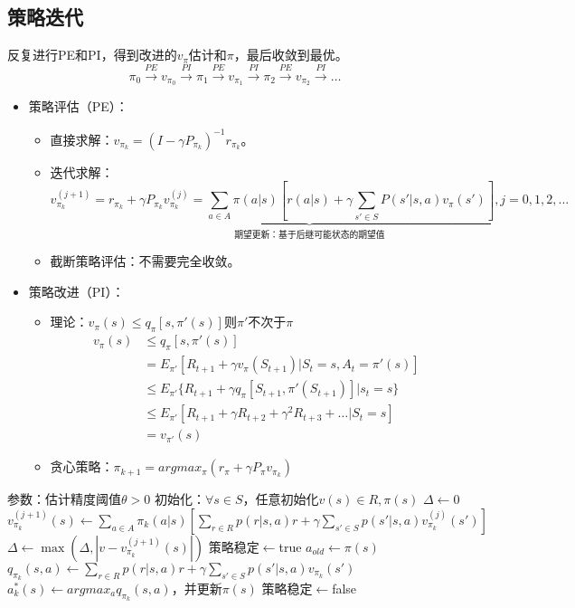 \documentclass[
12pt, %
a4paper, 
oneside, %
headinclude,footinclude, %
]{scrartcl}
\begin{document}
\subsection[策略迭代]{策略迭代}
反复进行PE和PI，得到改进的$ v_{\pi} $估计和$ \pi $，最后收敛到最优。
$$ \pi_0 \xrightarrow{PE} v_{\pi_0} \xrightarrow{PI} \pi_1 \xrightarrow{PE} v_{\pi_1} \xrightarrow{PI} \pi_2 \xrightarrow{PE} v_{\pi_2} \xrightarrow{PI} \dots $$
\begin{itemize}
\item 策略评估（PE）：
\begin{itemize}
\item 直接求解：$ v_{\pi_k} = (I - \gamma P_{\pi_k})^{-1} r_{\pi_k} $。
\item 迭代求解：
$$ \underbrace{v_{\pi_k}^{(j + 1)} = r_{\pi_k} + \gamma P_{\pi_k} v_{\pi_k}^{(j)} = \sum_{a \in A} \pi(a|s)[r(a|s) + \gamma \sum_{s' \in S}P(s'|s, a)v_{\pi}(s')], j = 0, 1, 2, \dots}_{\text{期望更新：基于后继可能状态的期望值}} $$
\item 截断策略评估：不需要完全收敛。
\end{itemize}
\item 策略改进（PI）：
\begin{itemize}
\item 理论：$ v_{\pi}(s) \leq q_{\pi}[s, \pi'(s)] $则$ \pi' $不次于$ \pi $
\begin{align*}
v_{\pi}(s) &\leq q_{\pi}[s, \pi'(s)] \\
&= E_{\pi'} [R_{t + 1} + \gamma v_{\pi}(S_{t + 1})|S_t = s, A_t = \pi'(s)] \\
&\leq E_{\pi'} \{R_{t + 1} + \gamma q_{\pi}[S_{t + 1}, \pi'(S_{t + 1})]|s_t = s\} \\
&\leq E_{\pi'} [R_{t + 1} + \gamma R_{t + 2} + \gamma^2 R_{t + 3} + \dots|S_t = s] \\
&= v_{\pi'}(s)
\end{align*}
\item 贪心策略：$ \pi_{k + 1} = argmax_{\pi}(r_{\pi} + \gamma P_{\pi} v_{\pi_k}) $
\end{itemize}
\end{itemize}
\begin{myalgorithm}[策略迭代]
\State 参数：估计精度阈值$ \theta > 0 $
\State 初始化：$ \forall s \in S $，任意初始化$ v(s) \in R, \pi(s) $
\Repeat
\Repeat {}
\State $ \Delta \gets 0 $
\State $ v_{\pi_k}^{(j + 1)}(s) \gets \sum_{a \in A} \pi_k(a|s)[\sum_{r \in R} p(r|s,a)r + \gamma \sum_{s' \in S} p(s'|s, a) v_{\pi_k}^{(j)}(s')] $
\State $ \Delta \gets \max(\Delta, |v - v_{\pi_k}^{(j + 1)}(s)|) $
\EndFor
\Until{$ \Delta < \theta $}
\State 策略稳定$ \gets $true 
\State $ a_{old} \gets \pi(s) $
\State $ q_{\pi_k}(s, a) \gets \sum_{r \in R} p(r|s, a)r + \gamma \sum_{s' \in S} p(s'|s, a)v_{\pi_k}(s') $
\EndFor
\State $ a^*_k(s) \gets argmax_a q_{\pi_k}(s, a) $，并更新$ \pi(s)  $
\State 策略稳定$ \gets $false
\EndIf
\EndFor
{}
\end{myalgorithm}
\end{document}
